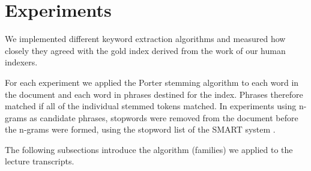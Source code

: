 \section{Experiments}
\label{sec:exp}



We implemented different keyword extraction algorithms and measured
how closely they agreed with the gold index derived from the work of
our human indexers.


For each experiment we applied the Porter stemming algorithm to each
word in the document and each word in phrases destined for the index.
Phrases therefore matched if all of the individual stemmed tokens
matched. In experiments using n-grams as candidate phrases, stopwords
were removed from the document before the n-grams were formed, using
the stopword list of the SMART system \cite{salton1971smart}.


The following subsections introduce the algorithm (families) we
applied to the lecture transcripts.
